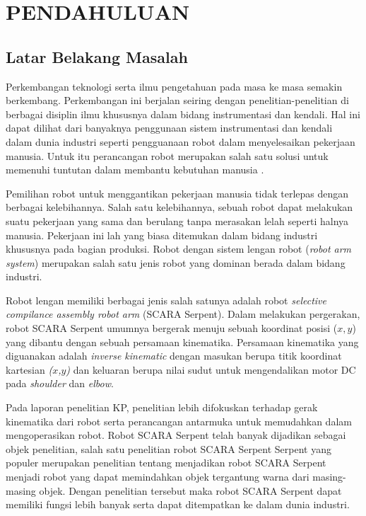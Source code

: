 
\chapter{PENDAHULUAN}

\section{Latar Belakang Masalah}

Perkembangan teknologi serta ilmu pengetahuan pada masa ke masa semakin berkembang. Perkembangan ini berjalan seiring dengan penelitian-penelitian di berbagai disiplin ilmu khususnya dalam bidang instrumentasi dan kendali. Hal ini dapat dilihat dari banyaknya penggunaan sistem instrumentasi dan kendali dalam dunia industri seperti pengguanaan robot dalam menyelesaikan pekerjaan manusia. Untuk itu perancangan robot merupakan salah satu solusi untuk memenuhi tuntutan dalam membantu kebutuhan manusia \cite{Faris2012}.

Pemilihan robot untuk menggantikan pekerjaan manusia tidak terlepas dengan berbagai kelebihannya. Salah satu kelebihannya, sebuah robot dapat melakukan suatu pekerjaan yang sama dan berulang tanpa merasakan lelah seperti halnya manusia. Pekerjaan ini lah yang biasa ditemukan dalam bidang industri khususnya pada bagian produksi. Robot dengan sistem lengan robot (\emph {robot arm system}) merupakan salah satu jenis robot yang dominan berada dalam bidang industri\cite{Bimantaka2014}. 

Robot lengan memiliki berbagai jenis salah satunya adalah robot \emph{selective compilance assembly robot arm} (SCARA Serpent). Dalam melakukan pergerakan, robot SCARA Serpent umumnya bergerak menuju sebuah koordinat posisi ($x, y$) yang dibantu dengan sebuah persamaan kinematika. Persamaan kinematika yang diguanakan adalah \textit{inverse kinematic} dengan masukan berupa titik koordinat kartesian \textit{($x$,$y$)} dan keluaran berupa nilai sudut untuk mengendalikan motor DC pada \textit{shoulder} dan \textit{elbow}.

Pada laporan penelitian KP, penelitian lebih difokuskan terhadap gerak kinematika dari robot serta perancangan antarmuka untuk memudahkan dalam mengoperasikan robot. Robot SCARA Serpent telah banyak dijadikan sebagai objek penelitian, salah satu penelitian robot SCARA Serpent Serpent yang populer merupakan penelitian tentang menjadikan robot SCARA Serpent menjadi robot yang dapat memindahkan objek tergantung warna dari masing-masing objek. Dengan penelitian tersebut maka robot SCARA Serpent dapat memiliki fungsi lebih banyak serta dapat ditempatkan ke dalam dunia industri.

